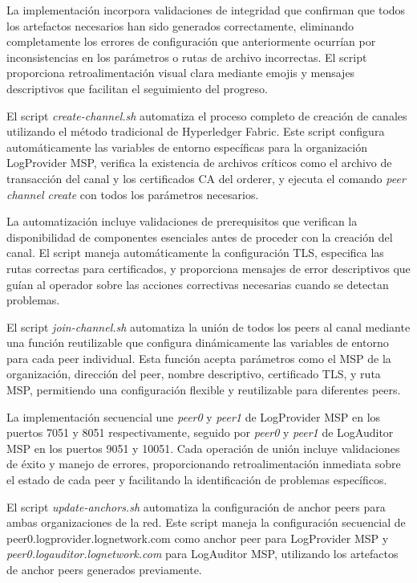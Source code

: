 La implementación incorpora validaciones de integridad que confirman que todos los artefactos necesarios han sido generados correctamente, eliminando completamente los errores de configuración que anteriormente ocurrían por inconsistencias en los parámetros o rutas de archivo incorrectas. El script proporciona retroalimentación visual clara mediante emojis y mensajes descriptivos que facilitan el seguimiento del progreso.


El script \textit{create-channel.sh} automatiza el proceso completo de creación de canales utilizando el método tradicional de Hyperledger Fabric. Este script configura automáticamente las variables de entorno específicas para la organización LogProvider MSP, verifica la existencia de archivos críticos como el archivo de transacción del canal y los certificados CA del orderer, y ejecuta el comando \textit{peer channel create} con todos los parámetros necesarios.

La automatización incluye validaciones de prerequisitos que verifican la disponibilidad de componentes esenciales antes de proceder con la creación del canal. El script maneja automáticamente la configuración TLS, especifica las rutas correctas para certificados, y proporciona mensajes de error descriptivos que guían al operador sobre las acciones correctivas necesarias cuando se detectan problemas.


El script \textit{join-channel.sh} automatiza la unión de todos los peers al canal mediante una función reutilizable que configura dinámicamente las variables de entorno para cada peer individual. Esta función acepta parámetros como el MSP de la organización, dirección del peer, nombre descriptivo, certificado TLS, y ruta MSP, permitiendo una configuración flexible y reutilizable para diferentes peers.

La implementación secuencial une \textit{peer0} y \textit{peer1} de LogProvider MSP en los puertos 7051 y 8051 respectivamente, seguido por \textit{peer0} y \textit{peer1} de LogAuditor MSP en los puertos 9051 y 10051. Cada operación de unión incluye validaciones de éxito y manejo de errores, proporcionando retroalimentación inmediata sobre el estado de cada peer y facilitando la identificación de problemas específicos.


El script \textit{update-anchors.sh} automatiza la configuración de anchor peers para ambas organizaciones de la red. Este script maneja la configuración secuencial de peer0.logprovider.lognetwork.com como anchor peer para LogProvider MSP y \textit{peer0.logauditor.lognetwork.com} para LogAuditor MSP, utilizando los artefactos de anchor peers generados previamente.

